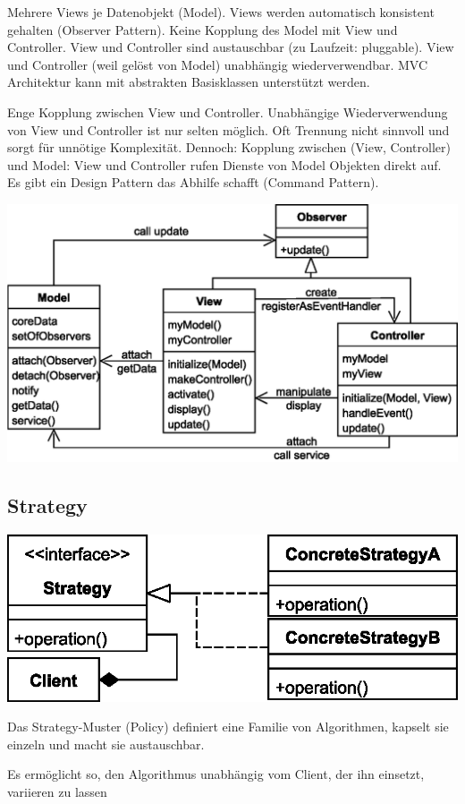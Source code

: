 \documentclass[a4paper,fontsize=9pt, DIV=calc]{scrartcl}
\begin{document}
\begin{multicols}{2}
\begin{description}[leftmargin=*]
\item[Konsequenzen (+)] Mehrere Views je Datenobjekt (Model). Views werden automatisch konsistent gehalten (Observer Pattern). Keine Kopplung des Model mit View und Controller. View und Controller sind austauschbar (zu Laufzeit: pluggable). View und Controller (weil gelöst von Model) unabhängig wiederverwendbar. MVC Architektur kann mit abstrakten Basisklassen unterstützt werden.
\item[Konsequenzen (-)] Enge Kopplung zwischen View und Controller. Unabhängige Wiederverwendung von View und Controller ist nur selten möglich. Oft Trennung nicht sinnvoll und sorgt für unnötige Komplexität. Dennoch: Kopplung zwischen (View, Controller) und Model: View und Controller rufen Dienste von Model Objekten direkt auf. Es gibt ein Design Pattern das Abhilfe schafft (Command Pattern).
\end{description}

\includegraphics[width=\columnwidth]{new/mvcumlnew}

\subsection{Strategy}

\begin{minipage}{0.68\columnwidth}
\includegraphics[width=\linewidth]{src/strategy}
\end{minipage}\hfill%
\begin{minipage}{0.3\columnwidth}
Das Strategy-Muster (Policy) definiert eine Familie von Algorithmen, kapselt sie einzeln und macht sie austauschbar. 
\end{minipage}
Es ermöglicht so, den Algorithmus unabhängig vom Client, der ihn einsetzt, variieren zu lassen



\end{multicols}
\end{document}
